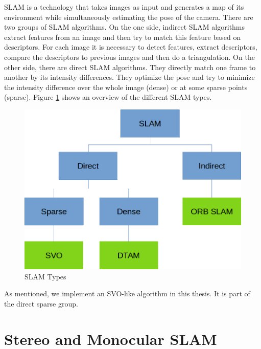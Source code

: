 \documentclass[11pt,a4paper,titlepage,oneside]{report}
\begin{document}
SLAM is a technology that takes images as input and generates a map of its environment while simultaneously estimating the pose of the camera. There are two groups of SLAM algorithms. On the one side, indirect SLAM algorithms extract features from an image and then try to match this feature based on descriptors. For each image it is necessary to detect features, extract descriptors, compare the descriptors to previous images and then do a triangulation. On the other side, there are direct SLAM algorithms. They directly match one frame to another by its intensity differences. They optimize the pose and try to minimize the intensity difference over the whole image (dense) or at some sparse points (sparse). Figure \ref{fig:slammodes} shows an overview of the different SLAM types.

\begin{figure}[H]
  \includegraphics[width=1.0\textwidth]{img/slam_modes.png}
  \caption{SLAM Types}\label{fig:slammodes}
\end{figure}

As mentioned, we implement an SVO-like algorithm in this thesis. It is part of the direct sparse group.

\section{Stereo and Monocular SLAM}
\end{document}
